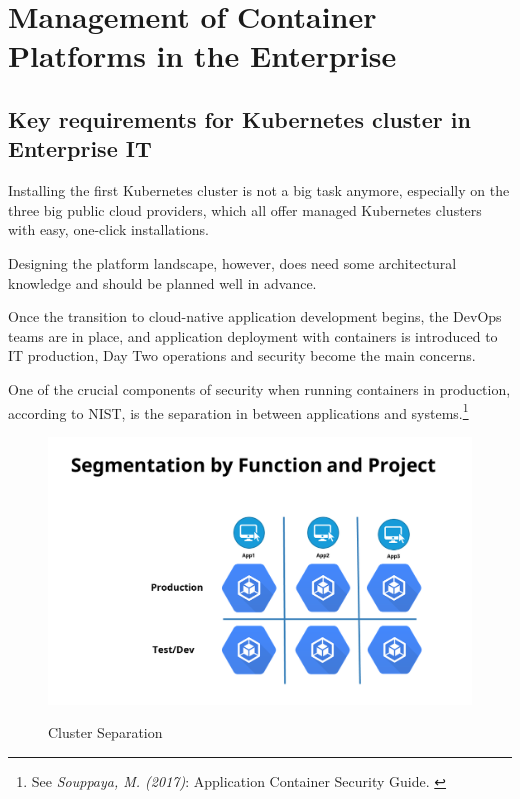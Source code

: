 %
%

\pagebreak
\section{Management of Container Platforms in the Enterprise}

\onehalfspacing

\subsection{Key requirements for Kubernetes cluster in Enterprise IT}

Installing the first Kubernetes cluster is not a big task anymore, especially on the three big public cloud providers, which all offer managed Kubernetes clusters with easy, one-click installations.

Designing the platform landscape, however, does need some architectural knowledge and should be planned well in advance.

Once the transition to cloud-native application development begins, the DevOps teams are in place, and application deployment with containers is introduced to IT production, Day Two operations and security become the main concerns.

One of the crucial components of security when running containers in production, according to NIST, is the separation in between applications and systems.\footnote{See \textit{Souppaya, M. (2017)}: Application Container Security Guide. \cite{sp800-190}}

\begin{figure}[h]
\centering
\caption {Cluster Separation}
\includegraphics[width=\linewidth]{images/separation}
\label{fig:clusterSeparation}
\end{figure}


